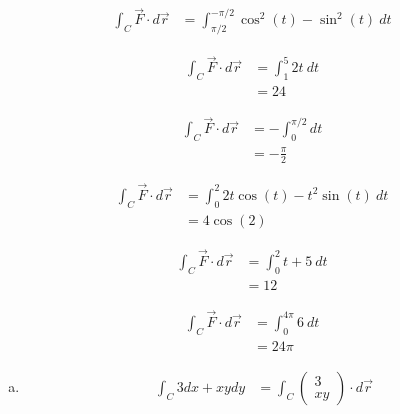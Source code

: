 \documentclass[8pt]{extarticle}
\begin{document}
  \begin{problem}{18.2}
    \begin{description}[font=\normalfont]
      \item[2:]
        \begin{align*}
          \int_{C}\vec{F}\cdot d\vec{r} &= \int_{\pi/2}^{-\pi/2} \cos^2(t)-\sin^2(t)~dt
        \end{align*}
      \item[10:]
        \begin{align*}
          \int_{C}\vec{F}\cdot d\vec{r} &= \int_{1}^{5}2t~dt\\
                                        &= 24
        \end{align*}
      \item[12:]
        \begin{align*}
          \int_{C}\vec{F}\cdot d\vec{r} &= -\int_{0}^{\pi/2} dt\\
                                        &= -\frac{\pi}{2}
        \end{align*}
      \item[14:]
        \begin{align*}
          \int_{C}\vec{F} \cdot d\vec{r} &= \int_{0}^{2} 2t\cos(t) - t^2\sin(t)~dt\\
                                         &= 4\cos(2)
        \end{align*}
      \item[18:]
        \begin{align*}
          \int_{C}\vec{F}\cdot d\vec{r} &= \int_{0}^{2}t+5~dt\\
                                        &= 12
        \end{align*}
      \item[22:]
        \begin{align*}
          \int_{C}\vec{F} \cdot d\vec{r} &= \int_{0}^{4\pi}6~dt\\
                                         &= 24\pi
        \end{align*}
      \item[24:]
        \begin{enumerate}[(a)]
          \item
            \begin{align*}
              \int_{C}3dx + xydy &= \int_{C}  \begin{pmatrix}3\\xy\end{pmatrix}\cdot d\vec{r}
            \end{align*}

\end{enumerate}
\end{description}
\end{problem}
\end{document}
